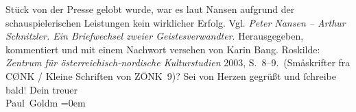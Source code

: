 \begin{ledgroupsized}[t]{13cm}
{{{                  Stück von der Presse gelobt wurde, war es laut Nansen aufgrund der schauspielerischen Leistungen kein wirklicher Erfolg.
                     Vgl. \emph{Peter Nansen – Arthur Schnitzler. Ein Briefwechsel
                        zweier Geistesverwandter}. Herausgegeben, kommentiert und mit einem
                     Nachwort versehen von Karin Bang. Roskilde:
                        \emph{Zentrum für österreichisch-nordische Kulturstudien}{ }2003, S. 8–9. (Småskrifter fra CØNK / Kleine Schriften
                     von ZÖNK 9)}}}\label{K_L02806-43h}?\pend
           \pstart
           Sei von Herzen gegrüßt und ſchreibe bald\textcolor{gray}{!}\pend
           \pstart
           Dein treuer {\\[\baselineskip]}\spacefill\mbox{Paul Goldm}\pend
           \leftskip=0em{}
         
         \endnumbering{}\end{ledgroupsized}  \newcommand{\dateiname}{L02806}\newcommand{\titel}{Paul Goldmann an Arthur Schnitzler, 22. 3. [1897]}\newcommand{\editorInnen}{Martin Anton Müller und Laura Untner}
      